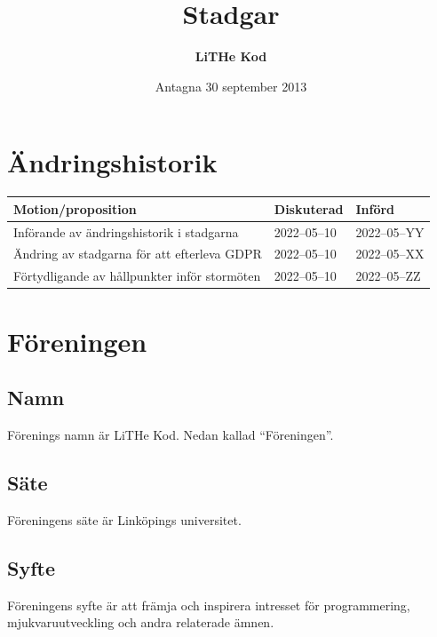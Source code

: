 \documentclass[11pt,a4paper]{article}
\title{\textbf{Stadgar}}
\date{Antagna 30 september 2013}
\author{\textbf{LiTHe Kod}}
\begin{document}
\maketitle
\thispagestyle{empty}
\pagebreak
\tableofcontents
\pagebreak

\section*{Ändringshistorik}
\begin{tabularx}{\textwidth}{X l l}
    \bfseries Motion/proposition & \bfseries Diskuterad & \bfseries Införd \\\hline
    \vspace{-0.6em} %
    Införande av ändringshistorik i stadgarna & 2022--05--10 & 2022--05--YY \\
    Ändring av stadgarna för att efterleva GDPR & 2022--05--10 & 2022--05--XX \\
    Förtydligande av hållpunkter inför stormöten & 2022--05--10 & 2022--05--ZZ \\
\end{tabularx}
\pagebreak

\pagestyle{fancy}

\section{Föreningen}
\subsection{Namn}
Förenings namn är LiTHe Kod. Nedan kallad ``Föreningen''.
\subsection{Säte}
Föreningens säte är Linköpings universitet.
\subsection{Syfte}\label{sec:syfte}
Föreningens syfte är att främja och inspirera intresset för programmering, mjukvaruutveckling och andra relaterade ämnen.
\end{document}
